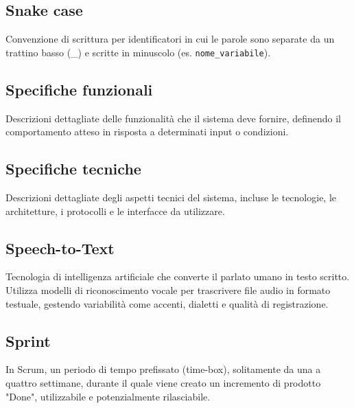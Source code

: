 \documentclass[a4paper, 11pt, oneside]{scrartcl} %
\begin{document}
\subsection*{Snake case}
Convenzione di scrittura per identificatori in cui le parole sono separate da un trattino basso (\_) e scritte in minuscolo (es. \texttt{nome\_variabile}).
\vspace{0.5cm}

\subsection*{Specifiche funzionali}


Descrizioni dettagliate delle funzionalità che il sistema deve fornire, definendo il comportamento atteso in risposta a determinati input o condizioni.

\vspace{0.5cm}

\subsection*{Specifiche tecniche}


Descrizioni dettagliate degli aspetti tecnici del sistema, incluse le tecnologie, le architetture, i protocolli e le interfacce da utilizzare.

\vspace{0.5cm}

\subsection*{Speech-to-Text}
Tecnologia di intelligenza artificiale che converte il parlato umano in testo scritto. Utilizza modelli di riconoscimento vocale per trascrivere file audio in formato testuale, gestendo variabilità come accenti, dialetti e qualità di registrazione.
\vspace{0.5cm}

\subsection*{Sprint}
In Scrum, un periodo di tempo prefissato (time-box), solitamente da una a quattro settimane, durante il quale viene creato un incremento di prodotto "Done", utilizzabile e potenzialmente rilasciabile.
\vspace{0.5cm}
\end{document}
